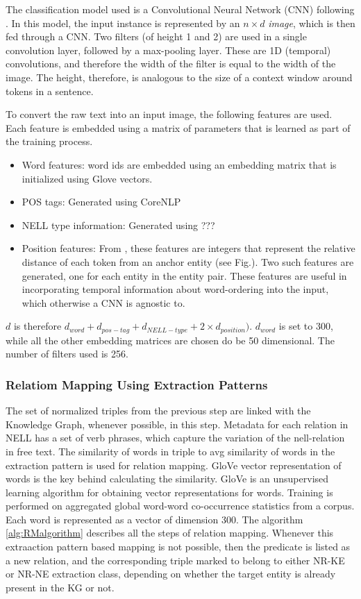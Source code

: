 The classification model used is a Convolutional Neural Network (CNN) following \cite{kim:2014}. In this model, the input instance is represented by an $ n \times d$ \textit{image}, which is then fed through a CNN. Two filters (of height 1 and 2) are used in a single convolution layer, followed by a max-pooling layer. These are 1D (temporal) convolutions, and therefore the width of the filter is equal to the width of the image. The height, therefore, is analogous to the size of a context window around tokens in a sentence.

To convert the raw text into an input image, the following features are used. Each feature is embedded using a matrix of parameters that is learned as part of the training process.

\begin{itemize}
\item Word features: word ids are embedded using an embedding matrix that is initialized using Glove \cite{pennington2014glove} vectors. 
\item POS tags: Generated using CoreNLP
\item NELL type information: Generated using ???
\item Position features: From \cite{zeng:2014}, these features are integers that represent the relative distance of each token from an anchor entity (see Fig.). Two such features are generated, one for each entity in the entity pair. These features are useful in incorporating temporal information about word-ordering into the input, which otherwise a CNN is agnostic to.
\end{itemize}

$d$ is therefore $d_{word} + d_{pos-tag} + d_{NELL-type} + 2\times d_{position})$. $d_{word}$ is set to 300, while all the other embedding matrices are chosen do be 50 dimensional. The number of filters used is 256.

\subsubsection{Relatiom Mapping Using Extraction Patterns}
The set of normalized triples from the previous step are linked with the Knowledge Graph, whenever possible, in this step.
Metadata for each relation in NELL has a set of verb phrases, which capture the variation of the nell-relation in free text.
The similarity of words in triple to avg similarity of words in the extraction pattern is used for relation mapping.
GloVe vector representation of words is the key behind calculating the similarity. GloVe is an unsupervised learning algorithm for obtaining vector representations for words. 
Training is performed on aggregated global word-word co-occurrence statistics from a corpus. Each word is represented as a vector of dimension 300.
The algorithm \ref{alg:RMalgorithm} describes all the steps of relation mapping.
Whenever this extraaction pattern based mapping is not possible, then the predicate is listed as a new relation, and the
corresponding triple marked to belong to either NR-KE or NR-NE extraction class, depending on whether the target entity is already present in the KG or not.

